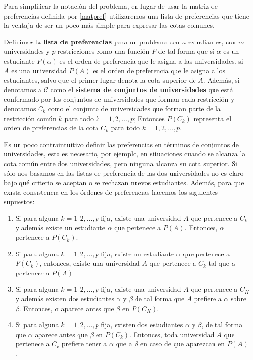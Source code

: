 Para simplificar la notación del problema, en lugar de usar la matriz de preferencias definida por \ref{matpref} utilizaremos una lista de preferencias que tiene la ventaja de ser un poco más simple para expresar las cotas comunes. 

\begin{dfn}
\label{listpref}
Definimos la \textbf{lista de preferencias} para un problema con $n$ estudiantes, con $m$ universidades y $p$ restricciones
como una función $P$ de tal forma que si $\alpha$ es un estudiante $P(\alpha)$ es el orden de preferencia que le asigna a las universidades,
si $A$ es una universidad $P(A)$ es el orden de preferencia que le asigna a los estudiantes, salvo que el primer lugar denota la cota superior de $A$.
Además, si denotamos a $\mathcal{C}$ como el \textbf{sistema de conjuntos de universidades} %
que está conformado por los conjuntos de universidades que forman cada restricción y denotamos $C_k$ como el conjunto de universidades que forman parte de la restricción común $k$ para todo $k=1,2,\dots,p$;
Entonces $P(C_k)$ representa el orden de preferencias de la cota $C_k$ para todo $k=1,2,\dots,p$.

Es un poco contraintuitivo definir las preferencias en términos de conjuntos de universidades, esto es necesario, por ejemplo, en situaciones cuando se alcanza la cota común entre dos universidades, pero ninguna alcanza su cota superior. Si sólo nos basamos en las listas de preferencia de las dos universidades no es claro bajo qué criterio se aceptan o se rechazan nuevos estudiantes. Además, para que exista consistencia en los órdenes de preferencias hacemos los siguientes supuestos:
\begin{enumerate}
\item Si para alguna $k=1,2,\dots,p$ fija, existe una universidad $A$ que pertenece a $C_k$ y además existe un estudiante $\alpha$ que pertenece a $P(A)$. Entonces, $\alpha$ pertenece a $P(C_k)$.
\item Si para alguna $k=1,2,\dots,p$ fija, existe un estudiante $\alpha$ que pertenece a $P(C_k)$, entonces, existe una universidad $A$ que pertenece a $C_k$ tal que $\alpha$ pertenece a $P(A)$.
\item Si para alguna $k=1,2,\dots,p$ fija, existe una universidad $A$ que pertenece a $C_K$ y además existen dos estudiantes $\alpha$ y $\beta$ de tal forma que $A$ prefiere a $\alpha$ sobre $\beta$. Entonces, $\alpha$ aparece antes que $\beta$ en $P(C_K)$.
\item Si para alguna $k=1,2,\dots,p$ fija, existen dos estudiantes $\alpha$ y $\beta$, de tal forma que $\alpha$ aparece antes que $\beta$ en $P(C_k)$. Entonces, toda universidad $A$ que pertenece a $C_k$ prefiere tener a $\alpha$ que a $\beta$ en caso de que aparezcan en $P(A)$.
\end{enumerate}
\end{dfn}

